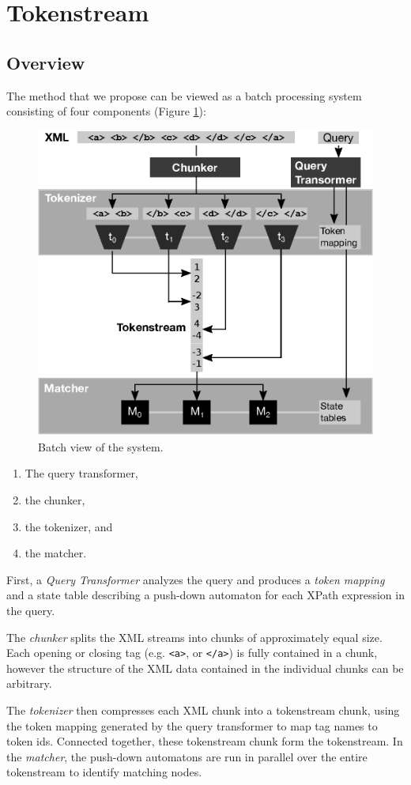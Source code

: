 \section{Tokenstream}\label{sec:yourmethod}


\subsection{Overview}

The method that we propose can be viewed as a batch processing system consisting
of four components (Figure \ref{fig:methodoverview}):

\begin{figure}[tb]\centering
	\includegraphics[width=.5\textwidth]{img/methodoverview.eps}
  \caption{Batch view of the system.\label{fig:methodoverview}}
\end{figure}

\begin{enumerate}
\item The query transformer, \item the chunker, \item the tokenizer, and \item the matcher.
\end{enumerate}

First, a \emph{Query Transformer} analyzes the query and produces a \emph{token
mapping} and a state table describing a push-down automaton for each XPath
expression in the query.

The \emph{chunker} splits the XML streams into chunks of approximately equal
size. Each opening or closing tag (e.g. \verb;<a>;, or \verb;</a>;) is fully
contained in a chunk, however the structure of the XML data contained in the
individual chunks can be arbitrary.

The \emph{tokenizer} then compresses each XML chunk into a tokenstream chunk,
using the token mapping generated by the query transformer to map tag names to
token ids. Connected together, these tokenstream chunk form the tokenstream. In
the \emph{matcher}, the push-down automatons are run in parallel over the
entire tokenstream to identify matching nodes.

